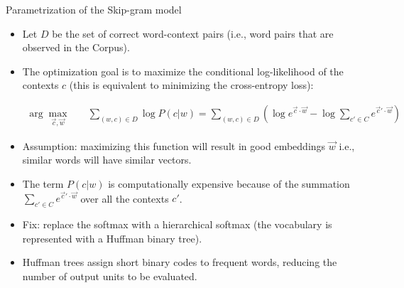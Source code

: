 \documentclass[handout]{beamer}
\begin{document}
\begin{frame}{Parametrization of the Skip-gram model}
\begin{scriptsize}
\begin{itemize}

\item Let $D$ be the set of correct word-context pairs (i.e., word pairs that are observed in the Corpus).

\item The optimization goal is to maximize the conditional log-likelihood of the contexts $c$ (this is equivalent to minimizing the cross-entropy loss):


\begin{equation}
\begin{split}
\operatorname{arg} \max_{\vec{c}, \vec{w}} & \quad \sum_{(w,c) \in D}{\log P(c|w)} = \sum_{(w,c) \in D} ( \log e^{\vec{c}\cdot \vec{w}} - \log \sum_{c'\in C} e^{\vec{c}'\cdot \vec{w}}  )
\end{split}
\end{equation}


\item Assumption: maximizing this function will result in good embeddings $\vec{w}$ i.e.,  similar words will have similar vectors.

\item The term $P(c|w)$ is computationally expensive because of the summation $\sum_{c'\in C} e^{\vec{c}'\cdot \vec{w}}$ over all the contexts $c'$.

\item Fix: replace the softmax with a hierarchical softmax (the vocabulary is represented with a Huffman binary tree). 

\item Huffman trees assign short binary codes to frequent words, reducing the number of output units to be evaluated.

\end{itemize}
\end{scriptsize}
\end{frame}



\end{document}
